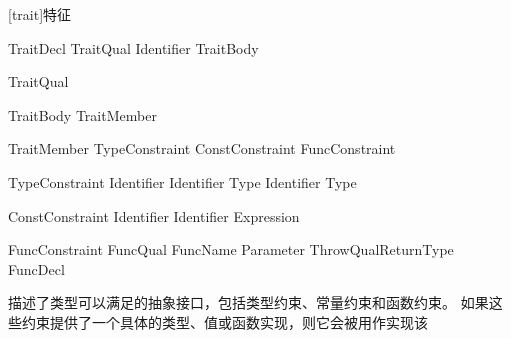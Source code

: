 
[trait]{特征}

\begin{bnf}{TraitDecl}
    TraitQual\bnfs {} Identifier TraitBody
\end{bnf}

\begin{bnf}{TraitQual}
\end{bnf}

\begin{bnf}{TraitBody}
    \terminal{\{} TraitMember\bnfs \terminal{\}}
\end{bnf}

\begin{bnf}{TraitMember}
    TypeConstraint \br
    ConstConstraint \br
    FuncConstraint
\end{bnf}

\begin{bnf}{TypeConstraint}
     Identifier \terminal{;} \br
     Identifier \terminal{:} Type \terminal{;} \br
     Identifier \terminal{=} Type \terminal{;}
\end{bnf}

\begin{bnf}{ConstConstraint}
     Identifier \terminal{;} \br
     Identifier \terminal{=} Expression \terminal{;}
\end{bnf}

\begin{bnf}{FuncConstraint}
    FuncQual\bnfs {} FuncName Parameter ThrowQual\bnfq ReturnType \terminal{;} \br
    FuncDecl
\end{bnf}

\pnum
{}描述了类型可以满足的抽象接口，包括类型约束、常量约束和函数约束。
如果这些约束提供了一个具体的类型、值或函数实现，则它会被用作实现该